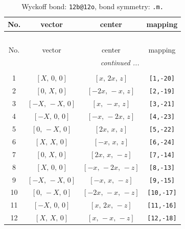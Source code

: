 \documentclass[fleqn,8pt]{jsarticle}
\begin{document}
\begin{longtable}{cccc}
\caption{Wyckoff bond: {\tt 12b@12o}, bond symmetry: {\tt .m.}}
 \\
 \hline \hline
No. & vector & center & mapping \\ \hline \endfirsthead

\multicolumn{3}{l}{\tablename\ \thetable{}} \\
 \hline \hline
No. & vector & center & mapping \\ \hline \endhead

 \hline \hline
\multicolumn{3}{r}{\footnotesize\it continued ...} \\ \endfoot

 \hline \hline
\multicolumn{3}{r}{} \\ \endlastfoot

1 & $\left[ X,\, 0,\, 0 \right]$ & $\left[ x,\, 2 x,\, z \right]$ & {\tt [1,-20]} \\ \hline
2 & $\left[ 0,\, X,\, 0 \right]$ & $\left[ - 2 x,\, - x,\, z \right]$ & {\tt [2,-19]} \\ \hline
3 & $\left[ - X,\, - X,\, 0 \right]$ & $\left[ x,\, - x,\, z \right]$ & {\tt [3,-21]} \\ \hline
4 & $\left[ - X,\, 0,\, 0 \right]$ & $\left[ - x,\, - 2 x,\, z \right]$ & {\tt [4,-23]} \\ \hline
5 & $\left[ 0,\, - X,\, 0 \right]$ & $\left[ 2 x,\, x,\, z \right]$ & {\tt [5,-22]} \\ \hline
6 & $\left[ X,\, X,\, 0 \right]$ & $\left[ - x,\, x,\, z \right]$ & {\tt [6,-24]} \\ \hline
7 & $\left[ 0,\, X,\, 0 \right]$ & $\left[ 2 x,\, x,\, - z \right]$ & {\tt [7,-14]} \\ \hline
8 & $\left[ X,\, 0,\, 0 \right]$ & $\left[ - x,\, - 2 x,\, - z \right]$ & {\tt [8,-13]} \\ \hline
9 & $\left[ - X,\, - X,\, 0 \right]$ & $\left[ - x,\, x,\, - z \right]$ & {\tt [9,-15]} \\ \hline
10 & $\left[ 0,\, - X,\, 0 \right]$ & $\left[ - 2 x,\, - x,\, - z \right]$ & {\tt [10,-17]} \\ \hline
11 & $\left[ - X,\, 0,\, 0 \right]$ & $\left[ x,\, 2 x,\, - z \right]$ & {\tt [11,-16]} \\ \hline
12 & $\left[ X,\, X,\, 0 \right]$ & $\left[ x,\, - x,\, - z \right]$ & {\tt [12,-18]} \\
\end{longtable}
\renewcommand{\arraystretch}{1.2}
\end{document}
